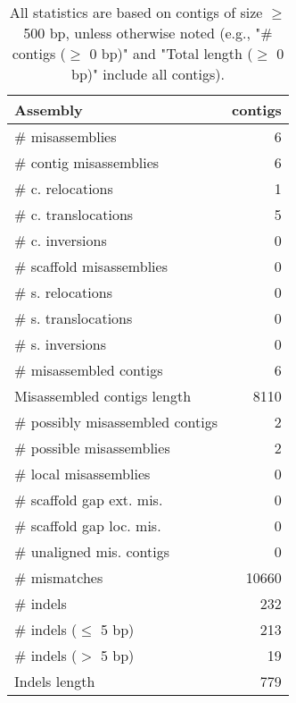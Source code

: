 \documentclass[12pt,a4paper]{article}
\begin{document}
\begin{table}[ht]
\begin{center}
\caption{All statistics are based on contigs of size $\geq$ 500 bp, unless otherwise noted (e.g., "\# contigs ($\geq$ 0 bp)" and "Total length ($\geq$ 0 bp)" include all contigs).}
\begin{tabular}{|l*{1}{|r}|}
\hline
Assembly & contigs \\ \hline
\# misassemblies & 6 \\ \hline
\hspace{2mm}\# contig misassemblies & 6 \\ \hline
\hspace{5mm}\# c. relocations & 1 \\ \hline
\hspace{5mm}\# c. translocations & 5 \\ \hline
\hspace{5mm}\# c. inversions & 0 \\ \hline
\hspace{2mm}\# scaffold misassemblies & 0 \\ \hline
\hspace{5mm}\# s. relocations & 0 \\ \hline
\hspace{5mm}\# s. translocations & 0 \\ \hline
\hspace{5mm}\# s. inversions & 0 \\ \hline
\# misassembled contigs & 6 \\ \hline
Misassembled contigs length & 8110 \\ \hline
\# possibly misassembled contigs & 2 \\ \hline
\hspace{5mm}\# possible misassemblies & 2 \\ \hline
\# local misassemblies & 0 \\ \hline
\# scaffold gap ext. mis. & 0 \\ \hline
\# scaffold gap loc. mis. & 0 \\ \hline
\# unaligned mis. contigs & 0 \\ \hline
\# mismatches & 10660 \\ \hline
\# indels & 232 \\ \hline
\hspace{5mm}\# indels ($\leq$ 5 bp) & 213 \\ \hline
\hspace{5mm}\# indels ($>$ 5 bp) & 19 \\ \hline
Indels length & 779 \\ \hline
\end{tabular}
\end{center}
\end{table}
\end{document}
